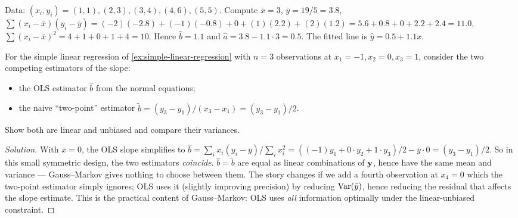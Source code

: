 \begin{example}
\label{ex:numerical-fit}
Data: $(x_i, y_i) = (1, 1), (2, 3), (3, 4), (4, 6), (5, 5)$.
Compute $\bar x = 3$, $\bar y = 19/5 = 3.8$,
$\sum (x_i - \bar x)(y_i - \bar y) = (-2)(-2.8) + (-1)(-0.8) + 0 + (1)(2.2) + (2)(1.2) = 5.6 + 0.8 + 0 + 2.2 + 2.4 = 11.0$,
$\sum (x_i - \bar x)^2 = 4 + 1 + 0 + 1 + 4 = 10$. Hence $\hat b = 1.1$
and $\hat a = 3.8 - 1.1 \cdot 3 = 0.5$. The fitted line is
$\hat y = 0.5 + 1.1 x$.
\end{example}

\begin{problem}
\label{prob:gauss-markov-comparison}
For the simple linear regression of \cref{ex:simple-linear-regression}
with $n = 3$ observations at $x_1 = -1, x_2 = 0, x_3 = 1$, consider
the two competing estimators of the slope:
\begin{itemize}
  \item the OLS estimator $\hat b$ from the normal equations;
  \item the naive ``two-point'' estimator $\tilde b = (y_3 - y_1)/(x_3 - x_1) = (y_3 - y_1)/2$.
\end{itemize}
Show both are linear and unbiased and compare their variances.
\end{problem}

\begin{proof}[Solution]
With $\bar x = 0$, the OLS slope simplifies to
$\hat b = \sum_i x_i (y_i - \bar y)/\sum_i x_i^2 = ((-1) y_1 + 0 \cdot y_2 + 1 \cdot y_3)/2 - \bar y \cdot 0 = (y_3 - y_1)/2$.
So in this small symmetric design, the two estimators \emph{coincide}.
$\hat b = \tilde b$ are equal as linear combinations of $\mathbf{y}$,
hence have the same mean and variance — Gauss–Markov gives nothing
to choose between them. The story changes if we add a fourth
observation at $x_4 = 0$ which the two-point estimator simply
ignores; OLS uses it (slightly improving precision) by reducing
$\operatorname{Var}(\bar y)$, hence reducing the residual that affects the slope
estimate. This is the practical content of Gauss–Markov: OLS uses
\emph{all} information optimally under the linear-unbiased
constraint.
\end{proof}
